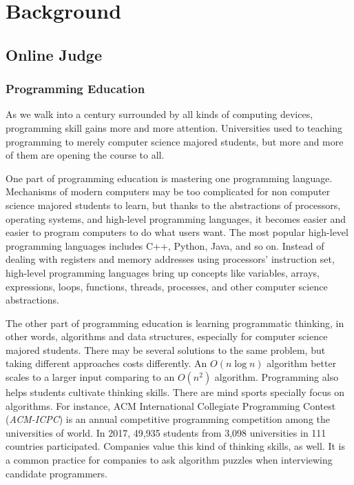
\chapter{Background}

\section{Online Judge}
    
    \subsection{Programming Education}

        As we walk into a century surrounded by all kinds of computing devices,
        programming skill gains more and more attention.
        Universities used to teaching programming to merely computer science majored students,
        but more and more of them are opening the course to all.

        One part of programming education is mastering one programming language.
        Mechanisms of modern computers may be too complicated for non computer science majored students to learn,
        but thanks to the abstractions of processors, operating systems, and high-level programming languages,
        it becomes easier and easier to program computers to do what users want.
        The most popular high-level programming languages includes C++, Python, Java, and so on.
        Instead of dealing with registers and memory addresses using processors' instruction set,
        high-level programming languages bring up concepts like variables, arrays, expressions, loops, functions,
        threads, processes, and other computer science abstractions.

        The other part of programming education is learning programmatic thinking, in other words,
        algorithms and data structures, especially for computer science majored students.
        There may be several solutions to the same problem, but taking different approaches costs differently.
        An $O(n\log n)$ algorithm better scales to a larger input comparing to an $O(n^2)$ algorithm.
        Programming also helps students cultivate thinking skills.
        There are mind sports specially focus on algorithms.
        For instance, ACM International Collegiate Programming Contest (\emph{ACM-ICPC}) is an annual
        competitive programming competition among the universities of world.
        In 2017, 49,935 students from 3,098 universities in 111 countries participated. \cite{acmicpc_fact_sheet}
        Companies value this kind of thinking skills, as well.
        It is a common practice for companies to ask algorithm puzzles when interviewing candidate programmers.

